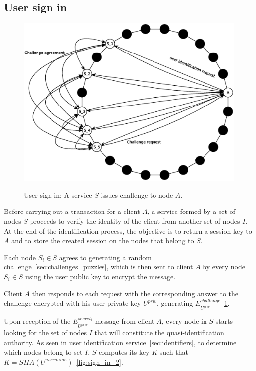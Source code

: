 \subsection{User sign in}
\begin{figure}[!htb]
\centering
\includegraphics[width=14cm]{../img/sign_in}\\
\caption{User sign in: A service $S$ issues challenge to node $A$.}
\label{fig:sign_in}
\end{figure}

Before carrying out a transaction for a client $A$, a service formed by a set of nodes $S$ proceeds to
verify the identity of the client from another set of nodes $I$. At the end of
the identification process, the objective is to return a session key to $A$
and to store the created session on the nodes that belong to $S$.

Each node $S_i \in S$ agrees to generating a random challenge~\ref{sec:challenges_puzzles}, which is then sent to
client $A$ by every node $S_i \in S$ using the user public key to encrypt the
message.

Client $A$ then responds to each request with the corresponding answer to the
challenge encrypted with his user private key $U^{priv}$, generating
$E^{challenge}_{U^{priv}}$~\ref{fig:sign_in}. 

Upon reception of the $E^{secret_i}_{U^{priv}}$ message from client $A$, every node in $S$
starts looking for the set of nodes $I$ that will constitute the
quasi-identification authority. As seen in user identification
service~\ref{sec:identifiers}, to determine which nodes belong to set $I$, $S$ computes
its key $K$ such that $K = SHA(U^{username})$~\ref{fig:sign_in_2}.

